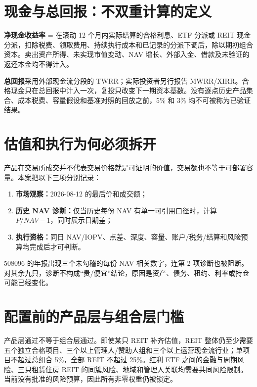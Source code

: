\section{现金与总回报：不双重计算的定义}

\begin{houseviewbox}[唯一允许的未来验证口径]
\textbf{净现金收益率} = 在滚动 12 个月内实际结算的合格利息、ETF 分派或 REIT 现金分派，扣除税费、领取费用、持续执行成本和已记录的分派下调后，除以期初组合资本。卖出资产所得、未实现市值变动、NAV 增长、外部入金、借款及未验证的返还本金均不得计入。\par
\textbf{总回报}采用外部现金流分段的 TWRR；实际投资者另行报告 MWRR/XIRR。合格现金只在总回报中计入一次，复投只改变下一期资本基数。没有逐点历史产品集合、成本税费、容量假设和基准对照的回放之前，5\% 和 3\% 均不可被称为已验证结果。
\end{houseviewbox}

\section{估值和执行为何必须拆开}

产品在交易所成交并不代表交易价格就是可证明的价值，交易额也不等于可部署容量。本案把以下三项分别记录：
\begin{enumerate}
  \item \textbf{市场观察：}2026-08-12 的最后价和成交额；
  \item \textbf{历史 NAV 诊断：}仅当历史每份 NAV 有单一可引用口径时，计算 $P/NAV-1$，同时展示日期差；
  \item \textbf{执行资格：}同日 NAV/IOPV、点差、深度、容量、账户/税务/结算和风险预算均完成后才可判断。
\end{enumerate}
508096 的年报出现三个未勾稽的每份 NAV 相关数字，连第 2 项诊断也被阻断。对其余九只，诊断不构成“贵/便宜”结论，原因是资产、债务、租约、利率或持仓可能已经变化。

\section{配置前的产品层与组合层门槛}

产品层通过不等于组合层通过。即使某只 REIT 补齐估值，REIT 整体仍至少需要五个独立合格项目、三个以上管理人/赞助人组和三个以上运营现金流行业；单项目不超过总组合 5\%，全部 REIT 不超过 25\%。红利 ETF 之间的金融与周期风险、三只租赁住房 REIT 的同簇风险、地域和管理人关联均需要共同风险限制。当前没有批准的风险预算，因此所有非零权重仍被锁定。
